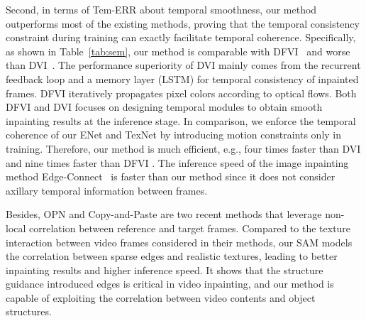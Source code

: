{\color{blue}
Second, in terms of Tem-ERR about temporal smoothness, our method outperforms most of the existing methods, proving that the temporal consistency constraint during training can exactly facilitate temporal coherence.
Specifically, as shown in Table~\ref{tab:sem}, our method is comparable with DFVI~\cite{Xu_2019_CVPR} and worse than DVI~\cite{Kim_2019_CVPR1}.
%
The performance superiority of DVI mainly comes from the recurrent feedback loop and a memory layer (LSTM) for temporal consistency of inpainted frames. 
DFVI iteratively propagates pixel colors according to optical flows. Both DFVI and DVI focuses on designing temporal modules to obtain smooth inpainting results at the inference stage. In comparison, we enforce the temporal coherence of our ENet and TexNet by introducing motion constraints only in training.}
Therefore, our method is much efficient, e.g., four times faster than DVI \cite{Kim_2019_CVPR1} and nine times faster than DFVI \cite{Xu_2019_CVPR}. 
The inference speed of the image inpainting method Edge-Connect~\cite{nazeri2019edgeconnect} is faster than our method since it does not consider axillary temporal information between frames. 



{\color{blue} Besides, OPN \cite{oh2019onion} and Copy-and-Paste \cite{lee2019copy} are two recent methods that leverage non-local correlation between reference and target frames.
Compared to the texture interaction between video frames considered in their methods, our SAM models the correlation between sparse edges and realistic textures, leading to better inpainting results and higher inference speed. It shows that the structure guidance introduced edges is critical in video inpainting, and our method is capable of exploiting the correlation between video contents and object structures. }
%

